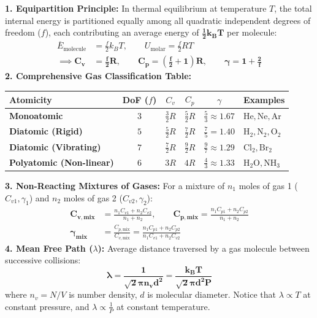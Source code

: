 \documentclass[10pt,twoside,openright]{book}
\begin{document}
\begin{formulabox}
\textbf{1. Equipartition Principle:}
In thermal equilibrium at temperature $T$, the total internal energy is partitioned equally among all quadratic independent degrees of freedom ($f$), each contributing an average energy of $\mathbf{\frac{1}{2}k_B T}$ per molecule:
\begin{align}
  \overline{E}_{\text{molecule}} &= \frac{f}{2}k_B T, \qquad U_{\text{molar}} = \frac{f}{2} R T \\
  \implies \mathbf{C_v} &= \mathbf{\frac{f}{2}R}, \qquad \mathbf{C_p} = \mathbf{\left(\frac{f}{2} + 1\right)R}, \qquad \mathbf{\gamma} = \mathbf{1 + \frac{2}{f}}
\end{align}
\textbf{2. Comprehensive Gas Classification Table:}
\begin{center}
\footnotesize
\setlength{\tabcolsep}{3pt}
\begin{tabularx}{\linewidth}{|l|c|c|c|c|Y|}
\hline
\textbf{Atomicity} & \textbf{DoF ($f$)} & $C_v$ & $C_p$ & $\gamma$ & \textbf{Examples} \\
\hline
\textbf{Monoatomic} & $3$ & $\frac{3}{2}R$ & $\frac{5}{2}R$ & $\frac{5}{3} \approx 1.67$ & $\mathrm{He, Ne, Ar}$ \\
\hline
\textbf{Diatomic (Rigid)} & $5$ & $\frac{5}{2}R$ & $\frac{7}{2}R$ & $\frac{7}{5} = 1.40$ & $\mathrm{H_2, N_2, O_2}$ \\
\hline
\textbf{Diatomic (Vibrating)} & $7$ & $\frac{7}{2}R$ & $\frac{9}{2}R$ & $\frac{9}{7} \approx 1.29$ & $\mathrm{Cl_2, Br_2}$ \\
\hline
\textbf{Polyatomic (Non-linear)} & $6$ & $3R$ & $4R$ & $\frac{4}{3} \approx 1.33$ & $\mathrm{H_2O, NH_3}$ \\
\hline
\end{tabularx}
\end{center}
\textbf{3. Non-Reacting Mixtures of Gases:}
For a mixture of $n_1$ moles of gas 1 ($C_{v1}, \gamma_1$) and $n_2$ moles of gas 2 ($C_{v2}, \gamma_2$):
\begin{align}
  \mathbf{C_{v,\text{mix}}} &= \frac{n_1 C_{v1} + n_2 C_{v2}}{n_1 + n_2}, \qquad \mathbf{C_{p,\text{mix}}} = \frac{n_1 C_{p1} + n_2 C_{p2}}{n_1 + n_2} \\
  \mathbf{\gamma_{\text{mix}}} &= \frac{C_{p,\text{mix}}}{C_{v,\text{mix}}} = \frac{n_1 C_{p1} + n_2 C_{p2}}{n_1 C_{v1} + n_2 C_{v2}}
\end{align}
\textbf{4. Mean Free Path ($\lambda$):}
Average distance traversed by a gas molecule between successive collisions:
\begin{equation}
  \mathbf{\lambda = \frac{1}{\sqrt{2} \pi n_v d^2} = \frac{k_B T}{\sqrt{2} \pi d^2 P}}
\end{equation}
where $n_v = N/V$ is number density, $d$ is molecular diameter. Notice that $\lambda \propto T$ at constant pressure, and $\lambda \propto \frac{1}{P}$ at constant temperature.
\end{formulabox}
\end{document}
